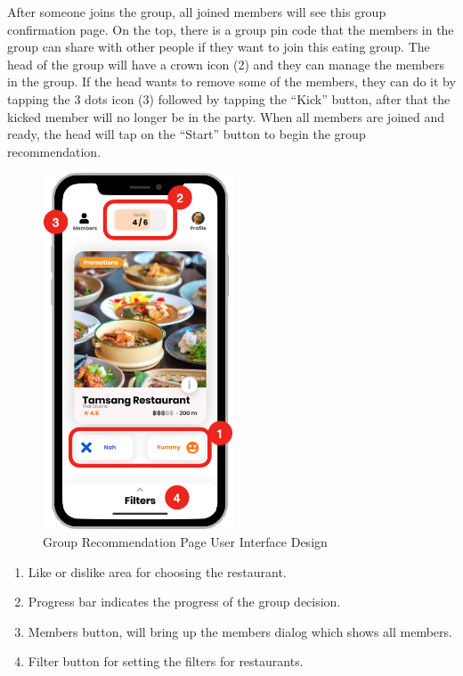 \documentclass[12pt,oneside,openright,a4paper]{cpe-english-project}
\begin{document}
After someone joins the group, all joined members will see this group confirmation page. On the top, there is a group pin code that the members in the group can share with other people if they want to join this eating group. The head of the group will have a crown icon (2) and they can manage the members in the group. If the head wants to remove some of the members, they can do it by tapping the 3 dots icon (3) followed by tapping the “Kick” button, after that the kicked member will no longer be in the party. When all members are joined and ready, the head will tap on the “Start” button to begin the group recommendation.

\newpage
\begin{figure}[H]\centering
\includegraphics[height=300pt]{./images/3ui_GroupRecommendationPageUserInterfaceDesign.png}
\caption{Group Recommendation Page User Interface Design}\label{fig:3ui_GroupRecommendationPageUserInterfaceDesign}
\end{figure}\vspace{-24pt}

\begin{enumerate}
\item Like or dislike area for choosing the restaurant.
\item Progress bar indicates the progress of the group decision.
\item Members button, will bring up the members dialog which shows all members.
\item Filter button for setting the filters for restaurants.
\end{enumerate}
\end{document}
